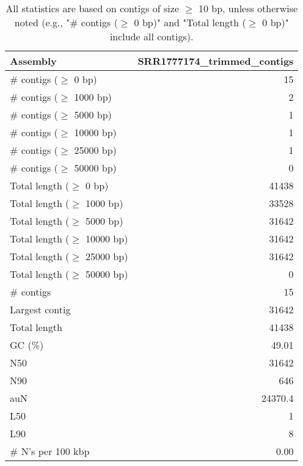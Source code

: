 \documentclass[12pt,a4paper]{article}
\begin{document}
\begin{table}[ht]
\begin{center}
\caption{All statistics are based on contigs of size $\geq$ 10 bp, unless otherwise noted (e.g., "\# contigs ($\geq$ 0 bp)" and "Total length ($\geq$ 0 bp)" include all contigs).}
\begin{tabular}{|l*{1}{|r}|}
\hline
Assembly & SRR1777174\_trimmed\_contigs \\ \hline
\# contigs ($\geq$ 0 bp) & 15 \\ \hline
\# contigs ($\geq$ 1000 bp) & 2 \\ \hline
\# contigs ($\geq$ 5000 bp) & 1 \\ \hline
\# contigs ($\geq$ 10000 bp) & 1 \\ \hline
\# contigs ($\geq$ 25000 bp) & 1 \\ \hline
\# contigs ($\geq$ 50000 bp) & 0 \\ \hline
Total length ($\geq$ 0 bp) & 41438 \\ \hline
Total length ($\geq$ 1000 bp) & 33528 \\ \hline
Total length ($\geq$ 5000 bp) & 31642 \\ \hline
Total length ($\geq$ 10000 bp) & 31642 \\ \hline
Total length ($\geq$ 25000 bp) & 31642 \\ \hline
Total length ($\geq$ 50000 bp) & 0 \\ \hline
\# contigs & 15 \\ \hline
Largest contig & 31642 \\ \hline
Total length & 41438 \\ \hline
GC (\%) & 49.01 \\ \hline
N50 & 31642 \\ \hline
N90 & 646 \\ \hline
auN & 24370.4 \\ \hline
L50 & 1 \\ \hline
L90 & 8 \\ \hline
\# N's per 100 kbp & 0.00 \\ \hline
\end{tabular}
\end{center}
\end{table}
\end{document}
